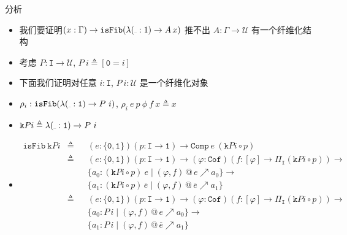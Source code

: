 \documentclass[aspectratio=169,xcolor=dvipsnames]{beamer}
\newcommand\calU{\mathcal{U}}
\newcommand\isFib{\mathtt{isFib}}
\newcommand\Comp{\mathtt{Comp}}
\newcommand\ttI{\mathtt{I}}
\newcommand\ttk{\mathtt{k}}
\newcommand\ttzero{\mathtt{0}}
\newcommand\ttone{\mathtt{1}}
\newcommand{\ul}{{\scalebox{0.4}[0.4]{\_}}}
\newcommand\Cof{\mathtt{Cof}}
\begin{document}
\begin{frame}{分析}
\begin{itemize}
  \item 我们要证明$(x:\Gamma)\to\isFib(\lambda(\ul:1)\to A\,x)$ 推不出 $A:\Gamma\to\calU$ 有一个纤维化结构
  \item 考虑 $P : \ttI \to \calU$, $P\ i \triangleq [\ttzero = i]$
  \item 下面我们证明对任意 $i : \ttI$, $P\ i : \calU$ 是一个纤维化对象
  \item $\rho_i : \isFib(\lambda(\ul:\ttone)\to P\ i)$, $\rho_i\ e\ p\ \phi\ f\ x\triangleq x$
  \item $\ttk Pi \triangleq \lambda(\ul:\ttone)\to P\ i$
  \item \begin{align*}\isFib\ \ttk Pi &\triangleq &&(e:\{\ttzero,\ttone\})(p:\ttI\to\ttone)\to\Comp\ e\ (\ttk Pi \circ p) \\
       &\triangleq&&(e:\{\ttzero,\ttone\})(p:\ttI\to\ttone)\to (\varphi:\Cof)(f:[\varphi]\to\Pi_{\ttI}(\ttk Pi \circ p)) \to\\
       &&&\{ a_0 : (\ttk Pi \circ p)\ e \mid (\varphi,f)\,@\,e \nearrow a_0 \} \to \\
       &&&\{a_1:(\ttk Pi \circ p)\,\overline{e}\mid(\varphi,f)\,@\,\overline{e}\nearrow a_1 \}\\
       &\triangleq&&(e:\{\ttzero,\ttone\})(p:\ttI\to\ttone)\to (\varphi:\Cof)(f:[\varphi]\to\Pi_{\ttI}(\ttk Pi \circ p)) \to\\
       &&&\{ a_0 : P\,i \mid (\varphi,f)\,@\,e \nearrow a_0 \} \to \\
       &&&\{a_1:P\,i \mid(\varphi,f)\,@\,\overline{e}\nearrow a_1 \}
  \end{align*}
\end{itemize}
\end{frame}
\end{document}
